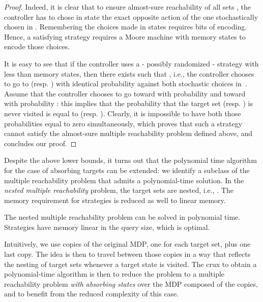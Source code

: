 \documentclass{llncs}
\begin{document}
\begin{proof}
Indeed, it is clear that to ensure almost-sure reachability of all sets , the controller has to chose in state  the exact opposite action of the one stochastically chosen in . Remembering the  choices made in states  requires  bits of encoding. Hence, a satisfying strategy requires a Moore machine with  memory states to encode those choices.

It is easy to see that if the controller uses a - possibly randomized - strategy  with less than  memory states, then there exists  such that , i.e., the controller chooses to go to  (resp. ) with identical probability against both stochastic choices in~. Assume that the controller chooses to go toward  with probability  and toward  with probability : this implies that the probability that the target set  (resp. ) is never visited is equal to  (resp. ). Clearly, it is impossible to have both those probabilities equal to zero simultaneously, which proves that such a strategy cannot satisfy the almost-sure multiple reachability problem defined above, and concludes our proof.
\end{proof}

Despite the above lower bounds, it turns out that the polynomial time algorithm for the case of absorbing targets can be extended:
we identify a subclass of the multiple reachability problem that admits a polynomial-time solution.
In the \emph{nested multiple reachability} problem, the target sets are nested, i.e., 
.
The memory requirement for strategies is reduced as well to linear memory.

\begin{theorem}
  \label{thm:monotonic-reach}
  The nested multiple reachability problem can be solved in polynomial time.
  Strategies have memory linear in the query size, which is optimal.
\end{theorem}

 Intuitively, we use  copies of the original MDP, one for each target set, plus one last copy. The idea is then to travel between those copies in a way that reflects the nesting of target sets whenever a target state is visited. The crux to obtain a polynomial-time algorithm is then to reduce the problem to a multiple reachability problem \textit{with absorbing states} over the MDP composed of the  copies, and to benefit from the reduced complexity of this case.
 
\end{document}
